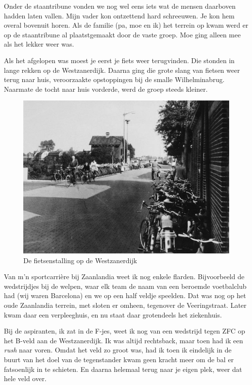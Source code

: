 \documentclass[12pt,twoside, openright]{memoir}
\begin{document}
Onder de staantribune vonden we nog wel eens iets wat de mensen daarboven hadden laten vallen. Mijn vader kon ontzettend hard schreeuwen. Je kon hem overal bovenuit horen. Als de familie (pa, moe en ik) het terrein op kwam werd er op de staantribune al plaatstgemaakt door de vaste groep. Moe ging alleen mee als het lekker weer was. 

Als het afgelopen was moest je eerst je fiets weer terugvinden. Die stonden in lange rekken op de Westzanerdijk. Daarna ging die grote slang van fietsen weer terug naar huis, veroorzaakte opstoppingen bij de smalle Wilhelminabrug. Naarmate de tocht naar huis vorderde, werd de groep steeds kleiner. 

\begin{figure}
\centering
\includegraphics[width=\textwidth]{img/75zfc2}
\caption*{\footnotesize De fietsenstalling op de Westzanerdijk}
\end{figure}

Van m’n sportcarrière bij Zaanlandia weet ik nog enkele flarden. Bijvoorbeeld de wedstrijdjes bij de welpen, waar elk team de naam van een beroemde voetbalclub had (wij waren Barcelona) en we op een half veldje speelden. Dat was nog op het oude Zaanlandia terrein, met sloten er omheen, tegenover de Veeringstraat. Later kwam daar een verpleeghuis, en nu staat daar grotendeels het ziekenhuis.

Bij de aspiranten, ik zat in de F-jes, weet ik nog van een wedstrijd tegen ZFC op het B-veld aan de Westzanerdijk. Ik was altijd rechtsback, maar toen had ik een \emph{rush} naar voren. Omdat het veld zo groot was, had ik toen ik eindelijk in de buurt van het doel van de tegenstander kwam geen kracht meer om de bal er fatsoenlijk in te schieten. En daarna helemaal terug naar je eigen plek, weer dat hele veld over. 
\end{document}
